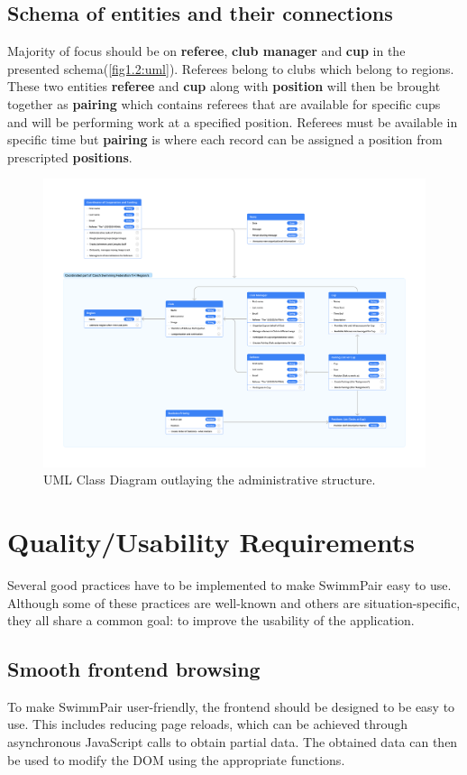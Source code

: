 \subsection*{Schema of entities and their connections}
Majority of focus should be on \textbf{referee}, \textbf{club manager} and \textbf{cup} in the presented schema(\autoref{fig1.2:uml}). Referees belong to clubs which belong to regions. These two entities \textbf{referee} and \textbf{cup} along with \textbf{position} will then be brought together as \textbf{pairing} which contains referees that are available for specific cups and will be performing work at a specified position. Referees must be available in specific time but \textbf{pairing} is where each record can be assigned a position from prescripted \textbf{positions}.
\begin{figure}[h]
\includegraphics[scale=0.160]{img/swimmpair_uml.png}
  \caption{UML Class Diagram outlaying the administrative structure.}
  \label{fig1.2:uml}
\end{figure}

\section{Quality/Usability Requirements}
Several good practices have to be implemented to make SwimmPair easy to use. Although some of these practices are well-known and others are situation-specific, they all share a common goal: to improve the usability of the application.
\subsection*{Smooth frontend browsing}
To make SwimmPair user-friendly, the frontend should be designed to be easy to use. This includes reducing page reloads, which can be achieved through asynchronous JavaScript calls to obtain partial data. The obtained data can then be used to modify the DOM using the appropriate functions. 
